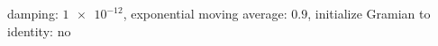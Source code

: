 damping: $\num[scientific-notation=true]{1e-12}$, exponential moving average: $\num[scientific-notation=true]{0.9}$, initialize Gramian to identity: $\text{no}$